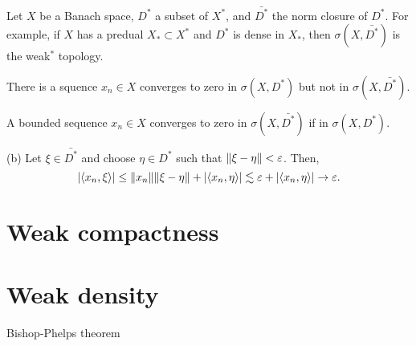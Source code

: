 \documentclass{../note}
\begin{document}
\begin{prb}
Let $X$ be a Banach space, $D^*$ a subset of $X^*$, and $\bar{D^*}$ the norm closure of $D^*$.
For example, if $X$ has a predual $X_*\subset X^*$ and $D^*$ is dense in $X_*$, then $\sigma(X,\bar{D^*})$ is the weak$^*$ topology.
\begin{parts}
\item There is a squence $x_n\in X$ converges to zero in $\sigma(X,D^*)$ but not in $\sigma(X,\bar{D^*})$.
\item A bounded sequence $x_n\in X$ converges to zero in $\sigma(X,\bar{D^*})$ if in $\sigma(X,D^*)$.
\end{parts}
\end{prb}
\begin{pf}
(b)
Let $\xi\in\bar{D^*}$ and choose $\eta\in D^*$ such that $\|\xi-\eta\|<\varepsilon$.
Then,
\[|\langle x_n,\xi\rangle|\le\|x_n\|\|\xi-\eta\|+|\langle x_n,\eta\rangle|\lesssim\varepsilon+|\langle x_n,\eta\rangle|\to\varepsilon.\]
\end{pf}



\section{Weak compactness}
\begin{prb}
\end{prb}
\begin{prb}
\end{prb}
\begin{prb}
\end{prb}

\section{Weak density}
Bishop-Phelps theorem
\end{document}
